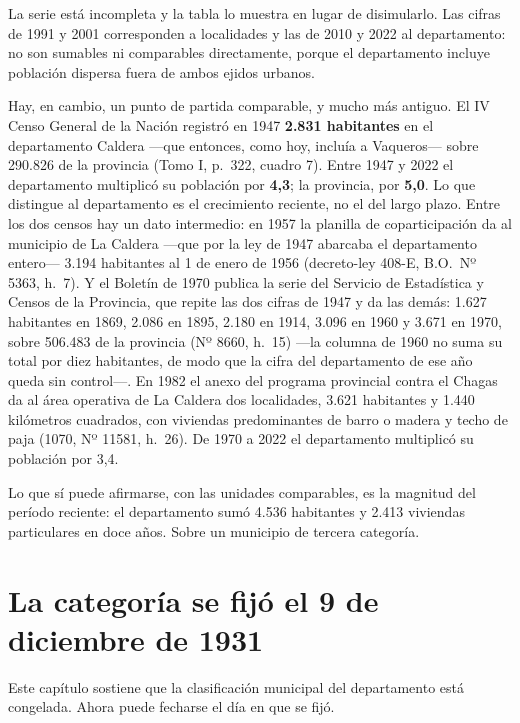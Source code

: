 La serie está incompleta y la tabla lo muestra en lugar de disimularlo. Las cifras de 1991 y 2001 corresponden a localidades y las de 2010 y 2022 al departamento: no son sumables ni comparables directamente, porque el departamento incluye población dispersa fuera de ambos ejidos urbanos.

Hay, en cambio, un punto de partida comparable, y mucho más antiguo. El IV Censo General de la Nación registró en 1947 \textbf{2.831 habitantes} en el departamento Caldera ---que entonces, como hoy, incluía a Vaqueros--- sobre 290.826 de la provincia (Tomo I, p.\ 322, cuadro 7). Entre 1947 y 2022 el departamento multiplicó su población por \textbf{4,3}; la provincia, por \textbf{5,0}. Lo que distingue al departamento es el crecimiento reciente, no el del largo plazo. Entre los dos censos hay un dato intermedio: en 1957 la planilla de coparticipación da al municipio de La Caldera ---que por la ley de 1947 abarcaba el departamento entero--- 3.194 habitantes al 1 de enero de 1956 (decreto-ley 408-E, B.O.\ Nº 5363, h.\ 7). Y el Boletín de 1970 publica la serie del Servicio de Estadística y Censos de la Provincia, que repite las dos cifras de 1947 y da las demás: 1.627 habitantes en 1869, 2.086 en 1895, 2.180 en 1914, 3.096 en 1960 y 3.671 en 1970, sobre 506.483 de la provincia (Nº 8660, h.\ 15) ---la columna de 1960 no suma su total por diez habitantes, de modo que la cifra del departamento de ese año queda sin control---. En 1982 el anexo del programa provincial contra el Chagas da al área operativa de La Caldera dos localidades, 3.621 habitantes y 1.440 kilómetros cuadrados, con viviendas predominantes de barro o madera y techo de paja (1070, Nº 11581, h.\ 26). De 1970 a 2022 el departamento multiplicó su población por 3,4.

Lo que sí puede afirmarse, con las unidades comparables, es la magnitud del período reciente: el departamento sumó 4.536 habitantes y 2.413 viviendas particulares en doce años. Sobre un municipio de tercera categoría.

\section{La categoría se fijó el 9 de diciembre de 1931}

Este capítulo sostiene que la clasificación municipal del departamento está congelada. Ahora
puede fecharse el día en que se fijó.

